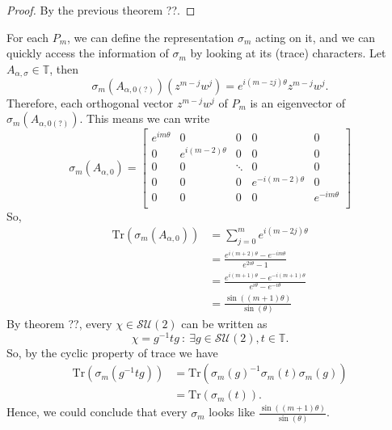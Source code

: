 \documentclass{article}
\begin{document}
\begin{proof}
   By the previous theorem ??. 
\end{proof}

For each $P_m$, we can define the representation $\sigma_m$ acting on it, and we can quickly access the information of $\sigma_m$ by looking at its (trace) characters. Let $A_{\alpha, \sigma} \in \mathbb{T}$, then
\begin{equation}
    \sigma_m(A_{\alpha, 0(?)})(z^{m-j}w^{j}) = e^{i(m-zj)\theta}z^{m-j}w^{j}.
\end{equation}
Therefore, each orthogonal vector $z^{m-j}w^{j}$ of $P_m$ is an eigenvector of $\sigma_m(A_{\alpha, 0(?)})$. This means we can write
\begin{equation}
    \sigma_m(A_{\alpha,0}) =
    \begin{bmatrix} 
        e^{im\theta} & 0  & 0  & 0  & 0  \\
        0 & e^{i(m-2)\theta} &0 &0  &0  \\
        0  &0 & \ddots &0  &0  \\
        0  &0 &0  & e^{-i(m-2)\theta} &0  \\
        0  &0  &0 &0    & e^{-im\theta} \\		
    \end{bmatrix}
\end{equation}
So, 
\begin{equation}
    \begin{split}
        \text{Tr}\left(\sigma_m(A_{\alpha, 0})\right) &=
        \sum_{j=0}^{m} e^{i(m-2j)\theta} \\
        &=\frac{e^{i(m+2)\theta}-e^{-im\theta}}{e^{2i\theta}-1} \\
        &= \frac{e^{i(m+1)\theta}-e^{-i(m+1)\theta}}{e^{i\theta}-e^{-i\theta}}\\
        &= \frac{ \sin\left((m+1)\theta\right)}{ \sin\left(\theta\right)}
    \end{split}
\end{equation}
By theorem ??, every $\chi \in \mathcal{SU}(2)$ can be written as 
\begin{equation}
    \chi = g^{-1}t g \ : \ \exists g \in \mathcal{SU}(2), t \in \mathbb{T}. 
\end{equation}
So, by the cyclic property of trace we have
\begin{equation}
    \begin{split}
        \text{Tr}\left(\sigma_m(g^{-1}t g)\right) &= 
        \text{Tr}\left(\sigma_m(g)^{-1}\sigma_m(t)\sigma_m(g)\right) \\
        &= \text{Tr}\left(\sigma_m(t)\right).
    \end{split}
\end{equation}
Hence, we could conclude that every $\sigma_m$ looks like $\frac{ \sin\left((m+1)\theta\right)}{ \sin\left(\theta\right)}$.
\end{document}
